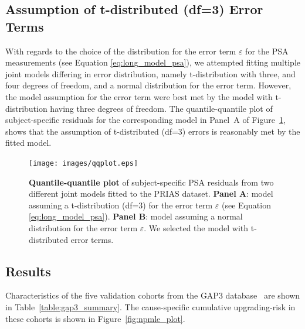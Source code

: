 \subsection{Assumption of t-distributed (df=3) Error Terms}
\label{subsec:t-dist-assumption}
With regards to the choice of the distribution for the error term $\varepsilon$ for the PSA measurements (see Equation \ref{eq:long_model_psa}), we attempted fitting multiple joint models differing in error distribution, namely t-distribution with three, and four degrees of freedom, and a normal distribution for the error term. However, the model assumption for the error term were best met by the model with t-distribution having three degrees of freedom. The quantile-quantile plot of subject-specific residuals for the corresponding model in Panel~A of Figure~\ref{fig:qqplot}, shows that the assumption of t-distributed (df=3) errors is reasonably met by the fitted model. 

\begin{figure}
\centerline{\texttt{[image: images/qqplot.eps]}}
\caption{\textbf{Quantile-quantile plot} of subject-specific PSA residuals from two different joint models fitted to the PRIAS dataset. \textbf{Panel A}: model assuming a t-distribution (df=3) for the error term $\varepsilon$ (see Equation \ref{eq:long_model_psa}). \textbf{Panel B}: model assuming a normal distribution for the error term $\varepsilon$. We selected the model with t-distributed error terms.}
\label{fig:qqplot}
\end{figure}

\clearpage
\subsection{Results}
Characteristics of the five validation cohorts from the GAP3 database~\citep{gap3_2018} are shown in Table~\ref{table:gap3_summary}. The cause-specific cumulative upgrading-risk in these cohorts is shown in Figure~\ref{fig:npmle_plot}.

